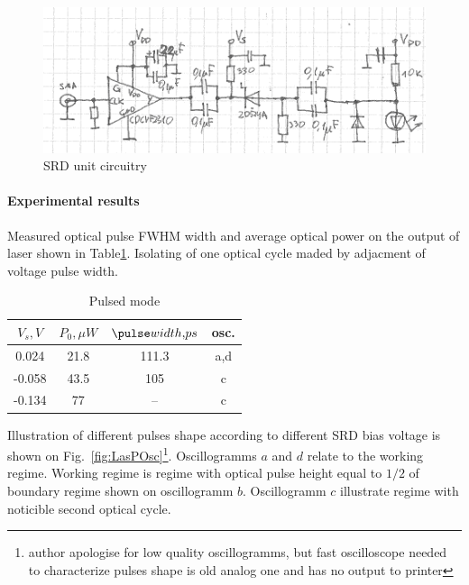 \begin{figure}
  \centering
  \includegraphics[scale=0.7]{LasPSRDunit}
  \caption{SRD unit circuitry}
  \label{fig:LasPSRDunit}
\end{figure}


\paragraph{Experimental results}

Measured optical pulse FWHM width and average optical power on the
output of laser shown in Table\ref{tab:LasPExp}.  Isolating of one
optical cycle maded by adjacment of voltage pulse width.

\begin{table}[!hbt]
  \centering
  \begin{tabular}{|c|c|c|c|}
    \hline
    $V_s{,}V$ & $P_0{,\mu}W$ & $\pulse width{,}ps$ & {osc.}\\
    \hline
    0.024 & 21.8 & 111.3 & a,d \\
    \hline
    -0.058 & 43.5 & 105 & c \\
    \hline
    -0.134 & 77 & -- & c \\
    \hline
  \end{tabular}
  \caption{Pulsed mode}
  \label{tab:LasPExp}
\end{table}

Illustration of different pulses shape according to different SRD bias
voltage is shown on Fig.~\ref{fig:LasPOsc}\footnote{author apologise
  for low quality oscillogramms, but fast oscilloscope needed to
  characterize pulses shape is old analog one and has no output to
  printer}.  Oscillogramms $a$ and $d$ relate to the working
regime. Working regime is regime with optical pulse height equal to
$1/2$ of boundary regime shown on oscillogramm $b$. Oscillogramm $c$
illustrate regime with noticible second optical cycle.

